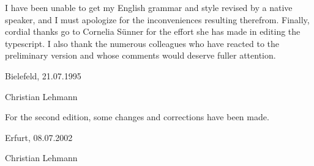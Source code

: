 I have been unable to get my English grammar and style revised by a native speaker, and I must apologize for the inconveniences resulting therefrom. Finally, cordial thanks go to Cornelia Sünner for the effort she has made in editing the typescript. I also thank the numerous colleagues who have reacted to the preliminary version and whose comments would deserve fuller attention.

\vspace{\baselineskip}

\begin{minipage}{.45\linewidth}
	\begin{flushleft}
		\noindent Bielefeld, 21.07.1995
	\end{flushleft}
\end{minipage}
\begin{minipage}{.45\linewidth}
	\begin{flushright}
		Christian Lehmann
	\end{flushright}
\end{minipage}

\vspace{\baselineskip}

\noindent For the second edition, some changes and corrections have been made.

\vspace{\baselineskip}

\begin{minipage}{.45\linewidth}
	\begin{flushleft}
		\noindent Erfurt, 08.07.2002
	\end{flushleft}
\end{minipage}
\begin{minipage}{.45\linewidth}
	\begin{flushright}
		Christian Lehmann
	\end{flushright}
\end{minipage}

